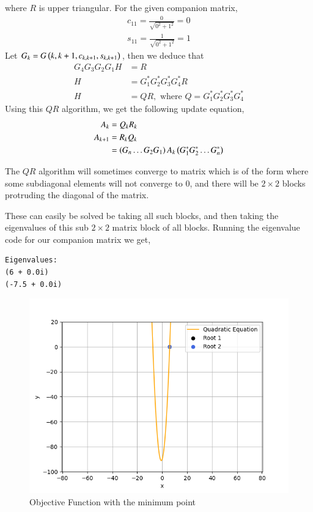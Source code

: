 \documentclass[journal]{IEEEtran}
\begin{document}
where $R$ is upper triangular.
For the given companion matrix,
\begin{align}
  c_{11} = \frac{0}{\sqrt{0^2 + 1^2}} = 0\\
  s_{11} = \frac{1}{\sqrt{0^2 + 1^2}} = 1
\end{align}
Let $G_k = G\left(k, k + 1, c_{k, k+1}, s_{k, k+1}\right)$, then we deduce that
\begin{align}
    G_4 G_3 G_2 G_1 H &= R\\
    H &= G_1^{\ast} G_2^{\ast} G_3^{\ast} G_4^{\ast} R\\
    H &= QR, \text{ where } Q = G_1^{\ast} G_2^{\ast} G_3^{\ast} G_4^{\ast}
\end{align}
Using this $QR$ algorithm, we get the following update equation,
\begin{align}
  A_{k} &= Q_{k}R_{k}\\
  A_{k + 1} &= R_{k}Q_{k}\\
            &= \left(G_{n}\dots G_{2} G_{1}\right) A_{k} \left(G_1^{\ast} G_2^{\ast} \dots G_n^{\ast}\right)
\end{align}

The $QR$ algorithm will sometimes converge to matrix which is of the form where some subdiagonal elements will not converge to 0, and there will be $2\times2$ blocks protruding the diagonal of the matrix. 
\begin{center}
\end{center}
These can easily be solved be taking all such blocks, and then taking the eigenvalues of this sub $2\times 2$ matrix block of all blocks.
Running the eigenvalue code for our companion matrix we get,
\begin{verbatim}
Eigenvalues:
(6 + 0.0i) 
(-7.5 + 0.0i)
\end{verbatim}

\begin{figure}[h!]
  \centering
  \includegraphics[width=0.7\columnwidth]{figs/graph.png}
  \caption{Objective Function with the minimum point}
  \label{label}
\end{figure}
\end{document}
